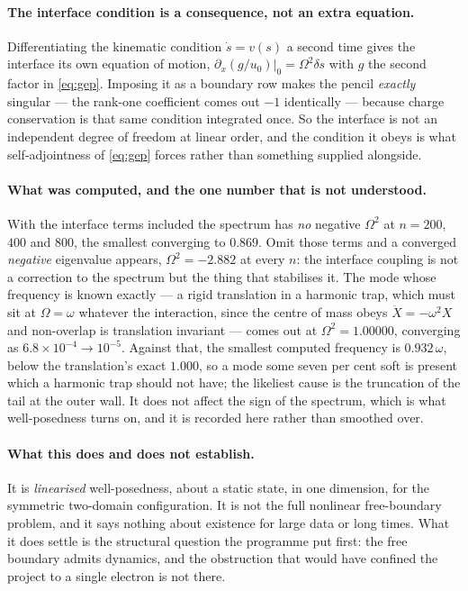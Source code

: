 \documentclass[11pt]{article}
\begin{document}
\paragraph{The interface condition is a consequence, not an extra equation.} Differentiating the
kinematic condition $\dot s=v(s)$ a second time gives the interface its own equation of motion,
$\partial_x(g/u_0)|_0=\Omega^2\delta s$ with $g$ the second factor in \eqref{eq:gep}. Imposing it as
a boundary row makes the pencil \emph{exactly} singular --- the rank-one coefficient comes out
$-1$ identically --- because charge conservation is that same condition integrated once. So the
interface is not an independent degree of freedom at linear order, and the condition it obeys is
what self-adjointness of \eqref{eq:gep} forces rather than something supplied alongside.

\paragraph{What was computed, and the one number that is not understood.} With the interface terms
included the spectrum has \emph{no} negative $\Omega^2$ at $n=200$, $400$ and $800$, the smallest
converging to $0.869$. Omit those terms and a converged \emph{negative} eigenvalue appears,
$\Omega^2=-2.882$ at every $n$: the interface coupling is not a correction to the spectrum but the
thing that stabilises it. The mode whose frequency is known exactly --- a rigid translation in a
harmonic trap, which must sit at $\Omega=\omega$ whatever the interaction, since the centre of mass
obeys $\ddot X=-\omega^2X$ and non-overlap is translation invariant --- comes out at
$\Omega^2=1.00000$, converging as $6.8\times10^{-4}\to10^{-5}$. Against that, the smallest computed
frequency is $0.932\,\omega$, below the translation's exact $1.000$, so a mode some seven per cent
soft is present which a harmonic trap should not have; the likeliest cause is the truncation of the
tail at the outer wall. It does not affect the sign of the spectrum, which is what well-posedness
turns on, and it is recorded here rather than smoothed over.

\paragraph{What this does and does not establish.} It is \emph{linearised} well-posedness, about a
static state, in one dimension, for the symmetric two-domain configuration. It is not the full
nonlinear free-boundary problem, and it says nothing about existence for large data or long times.
What it does settle is the structural question the programme put first: the free boundary admits
dynamics, and the obstruction that would have confined the project to a single electron is not
there.
\end{document}
